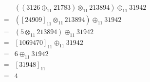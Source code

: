 \documentclass{../krypto}
\date{22. Oktober 2015}
\begin{document}
\maketitle



\subexercise

\subexercise
\begin{align*}
  &\left(\left(3126 \oplus_11 21783\right) \otimes_11 213894\right) \oplus_11 31942 \\
= &\left(\left[24909\right]_11 \otimes_11 213894\right) \oplus_11 31942 \\
= &\left(5 \otimes_11 213894\right) \oplus_11 31942 \\
= &\left[1069470\right]_11 \oplus_11 31942 \\
= &6 \oplus_11 31942 \\
= &\left[31948\right]_11 \\
= &4
\end{align*}

\subexercise



\subexercise

\subexercise

\subexercise



\subexercise

\subexercise
\end{document}
